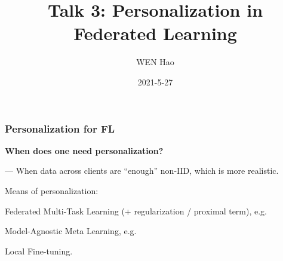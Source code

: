 


\title[Personalization]{Talk 3: Personalization in Federated Learning}
\date{2021-5-27}
\author[]{WEN Hao}




\setlength{\belowdisplayskip}{5pt} \setlength{\belowdisplayshortskip}{5pt}
\setlength{\abovedisplayskip}{5pt} \setlength{\abovedisplayshortskip}{5pt}


\begin{frame}
\titlepage %
\end{frame}

\begin{frame}
\frametitle{Personalization for FL}

{\bfseries When does one need personalization?}

\vspace{0.2em}
\noindent --- When data across clients are ``enough'' non-IID, which is more realistic.

\pause
\vspace{0.8em}

Means of personalization:
\begin{itemize}
    \item Federated Multi-Task Learning (+ regularization / proximal term), e.g. \cite{smith2017mocha}
    {
    \item Model-Agnostic Meta Learning, e.g. \cite{finn2017maml}
    \item Local Fine-tuning.}
\end{itemize}

\end{frame}

